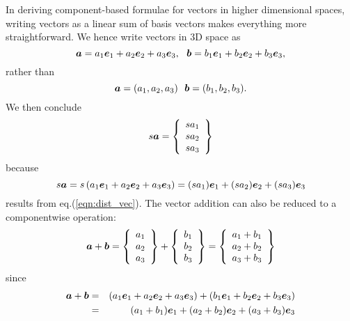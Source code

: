 \documentclass[10pt,a4j]{article}
\begin{document}
In deriving component-based formulae for vectors in higher dimensional spaces, writing vectors as a linear sum of basis vectors makes everything more straightforward. We hence write vectors in 3D space as 
\begin{equation}
    \fat{a}= a_1\fat{e}_1+ a_2\fat{e}_2+ a_3\fat{e}_3, \ \ 
    \fat{b}= b_1\fat{e}_1+ b_2\fat{e}_2+ b_3\fat{e}_3, 
    \label{eqn:}
\end{equation}
rather than 
\begin{equation}
    \fat{a}= (a_1,  a_2, a_3) \ \ 
    \fat{b}= (b_1,  b_2, b_3).
\end{equation}
We then conclude 
\begin{equation}
    s\mbox{\boldmath $a$}
    =
    \left\{
        \begin{array}{c}
            sa_1 \\
            sa_2 \\
            sa_3 
        \end{array}
    \right\}
    \label{eqn:}
\end{equation}
because 
\begin{equation}
    s\mbox{\boldmath $a$}= s \left(a_1\mbox{\boldmath $e$}_1+ a_2\mbox{\boldmath $e$}_2+ a_3\mbox{\boldmath $e$}_3\right)
	=(sa_1)\mbox{\boldmath $e$}_1+ (sa_2)\mbox{\boldmath $e$}_2+ (sa_3)\mbox{\boldmath $e$}_3
    \label{eqn:}
\end{equation}
results from eq.(\ref{eqn:dist_vec}). The vector addition can also be reduced to a componentwise operation:
\begin{equation}
    \mbox{\boldmath $a$}
    +
    \mbox{\boldmath $b$}
    =
    \left\{
        \begin{array}{c}
            a_1 \\
            a_2 \\
            a_3 
        \end{array}
    \right\}
    +
    \left\{
        \begin{array}{c}
            b_1 \\
            b_2 \\
            b_3 
        \end{array}
    \right\}
    =
    \left\{
        \begin{array}{c}
            a_1+b_1 \\
            a_2+b_2 \\
            a_3+b_3
        \end{array}
    \right\}
    \label{eqn:}
\end{equation}
since 
\begin{eqnarray}
    \mbox{\boldmath $a$}+\mbox{\boldmath $b$}
    &=&
    \left(a_1\mbox{\boldmath $e$}_1+ a_2\mbox{\boldmath $e$}_2+ a_3\mbox{\boldmath $e$}_3 \right)+
    \left(b_1\mbox{\boldmath $e$}_1+ b_2\mbox{\boldmath $e$}_2+ b_3\mbox{\boldmath $e$}_3 \right) \\
    &=&
    (a_1+b_1)\mbox{\boldmath $e$}_1
    +
    (a_2+b_2)\mbox{\boldmath $e$}_2
    +
    (a_3+b_3)\mbox{\boldmath $e$}_3
    \label{eqn:}
\end{eqnarray}
\end{document}
